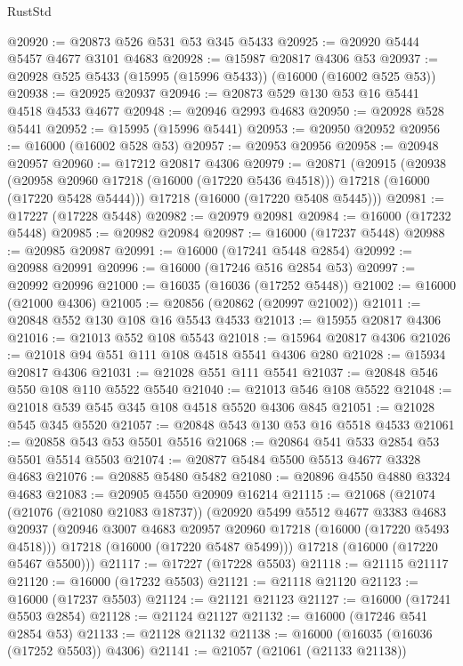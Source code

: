 \begin{lexlean}{RustStd}
\begin{coremodule}
@20920 := @20873 @526 @531 @53 @345 @5433
@20925 := @20920 @5444 @5457 @4677 @3101 @4683
@20928 := @15987 @20817 @4306 @53
@20937 := @20928 @525 @5433 (@15995 (@15996 @5433)) (@16000 (@16002 @525 @53))
@20938 := @20925 @20937
@20946 := @20873 @529 @130 @53 @16 @5441 @4518 @4533 @4677
@20948 := @20946 @2993 @4683
@20950 := @20928 @528 @5441
@20952 := @15995 (@15996 @5441)
@20953 := @20950 @20952
@20956 := @16000 (@16002 @528 @53)
@20957 := @20953 @20956
@20958 := @20948 @20957
@20960 := @17212 @20817 @4306
@20979 := @20871
    (@20915
      (@20938
        (@20958 @20960 @17218 (@16000 (@17220 @5436 @4518)))
        @17218
        (@16000 (@17220 @5428 @5444)))
      @17218
      (@16000 (@17220 @5408 @5445)))
@20981 := @17227 (@17228 @5448)
@20982 := @20979 @20981
@20984 := @16000 (@17232 @5448)
@20985 := @20982 @20984
@20987 := @16000 (@17237 @5448)
@20988 := @20985 @20987
@20991 := @16000 (@17241 @5448 @2854)
@20992 := @20988 @20991
@20996 := @16000 (@17246 @516 @2854 @53)
@20997 := @20992 @20996
@21000 := @16035 (@16036 (@17252 @5448))
@21002 := @16000 (@21000 @4306)
@21005 := @20856 (@20862 (@20997 @21002))
@21011 := @20848 @552 @130 @108 @16 @5543 @4533
@21013 := @15955 @20817 @4306
@21016 := @21013 @552 @108 @5543
@21018 := @15964 @20817 @4306
@21026 := @21018 @94 @551 @111 @108 @4518 @5541 @4306 @280
@21028 := @15934 @20817 @4306
@21031 := @21028 @551 @111 @5541
@21037 := @20848 @546 @550 @108 @110 @5522 @5540
@21040 := @21013 @546 @108 @5522
@21048 := @21018 @539 @545 @345 @108 @4518 @5520 @4306 @845
@21051 := @21028 @545 @345 @5520
@21057 := @20848 @543 @130 @53 @16 @5518 @4533
@21061 := @20858 @543 @53 @5501 @5516
@21068 := @20864 @541 @533 @2854 @53 @5501 @5514 @5503
@21074 := @20877 @5484 @5500 @5513 @4677 @3328 @4683
@21076 := @20885 @5480 @5482
@21080 := @20896 @4550 @4880 @3324 @4683
@21083 := @20905 @4550 @20909 @16214
@21115 := @21068
    (@21074
      (@21076 (@21080 @21083 @18737))
      (@20920
        @5499
        @5512
        @4677
        @3383
        @4683
        @20937
        (@20946 @3007 @4683 @20957 @20960 @17218 (@16000 (@17220 @5493 @4518)))
        @17218
        (@16000 (@17220 @5487 @5499)))
      @17218
      (@16000 (@17220 @5467 @5500)))
@21117 := @17227 (@17228 @5503)
@21118 := @21115 @21117
@21120 := @16000 (@17232 @5503)
@21121 := @21118 @21120
@21123 := @16000 (@17237 @5503)
@21124 := @21121 @21123
@21127 := @16000 (@17241 @5503 @2854)
@21128 := @21124 @21127
@21132 := @16000 (@17246 @541 @2854 @53)
@21133 := @21128 @21132
@21138 := @16000 (@16035 (@16036 (@17252 @5503)) @4306)
@21141 := @21057 (@21061 (@21133 @21138))

\end{coremodule}
\end{lexlean}
